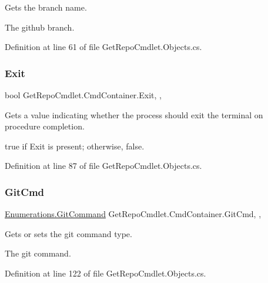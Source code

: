 Gets the branch name. 

The github branch. 

Definition at line 61 of file Get\+Repo\+Cmdlet.\+Objects.\+cs.

\mbox{\label{class_get_repo_cmdlet_1_1_cmd_container_a82345df98877ab881d8363d2bae6b51c}} 
\subsubsection{\texorpdfstring{Exit}{Exit}}
{\footnotesize\ttfamily bool Get\+Repo\+Cmdlet.\+Cmd\+Container.\+Exit\hspace{0.3cm}{\ttfamily [get]}, {}, {\ttfamily [package]}}



Gets a value indicating whether the process should exit the terminal on procedure completion. 

{\ttfamily true} if Exit is present; otherwise, {\ttfamily false}. 

Definition at line 87 of file Get\+Repo\+Cmdlet.\+Objects.\+cs.

\mbox{\label{class_get_repo_cmdlet_1_1_cmd_container_a7f722b89dac0b65bfb0f897350ee68c3}} 
\subsubsection{\texorpdfstring{Git\+Cmd}{GitCmd}}
{\footnotesize\ttfamily \mbox{\hyperlink{class_get_repo_cmdlet_1_1_enumerations_a52683b5a6aca649a73b7bc9a076cc747}{Enumerations.\+Git\+Command}} Get\+Repo\+Cmdlet.\+Cmd\+Container.\+Git\+Cmd\hspace{0.3cm}{\ttfamily [get]}, {\ttfamily [set]}, {\ttfamily [package]}}



Gets or sets the git command type. 

The git command. 

Definition at line 122 of file Get\+Repo\+Cmdlet.\+Objects.\+cs.

